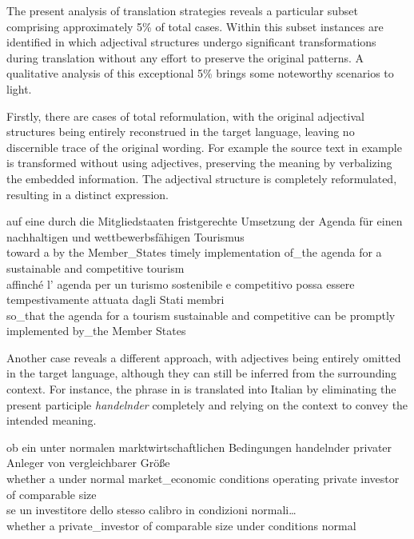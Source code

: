 \documentclass[output=paper,colorlinks,citecolor=brown]{langscibook}
\begin{document}
The present analysis of translation strategies reveals a particular subset comprising approximately 5\% of total cases. Within this subset instances are identified in which adjectival structures undergo significant transformations during translation without any effort to preserve the original patterns. A qualitative analysis of this exceptional 5\% brings some noteworthy scenarios to light.

Firstly, there are cases of total reformulation, with the original adjectival structures being entirely reconstrued in the target language, leaving no discernible trace of the original wording. For example the source text in example  is transformed without using adjectives, preserving the meaning by verbalizing the embedded information. The adjectival structure is completely reformulated, resulting in a distinct expression.

\ea%
    \label{ex:resi:53}
    \ea
\gll  auf  eine  durch  die  Mitgliedstaaten  fristgerechte  Umsetzung   der  Agenda  für  einen  nachhaltigen  und  wettbewerbsfähigen  Tourismus\\
    toward  a  by  the  Member\_States       timely  implementation   of\_the  agenda  for  a  sustainable  and  competitive  tourism\\

\ex
\gll   affinché  l’  agenda  per  un  turismo  sostenibile  e  competitivo   possa  essere  tempestivamente  attuata  dagli  Stati membri\\
  so\_that  the  agenda  for  a  tourism  sustainable  and  competitive  can  be             promptly  implemented  by\_the  Member States\\
\z
\z

Another case reveals a different approach, with adjectives being entirely omitted in the target language, although they can still be inferred from the surrounding context. For instance, the phrase in  is translated into Italian by eliminating the present participle \textit{handelnder} completely and relying on the context to convey the intended meaning.

\ea%
    \label{ex:resi:54}
\ea
\gll  ob  ein  unter  normalen  marktwirtschaftlichen  Bedingungen   handelnder  privater  Anleger  von  vergleichbarer  Größe\\
    whether  a  under  normal  market\_economic  conditions   operating  private  investor  of  comparable  size\\
\ex
\gll   se  un  investitore        dello  stesso  calibro  in  condizioni  normali…\\
   whether  a  private\_investor  of  comparable  size  under  conditions normal  \\
\z
\z
\end{document}
